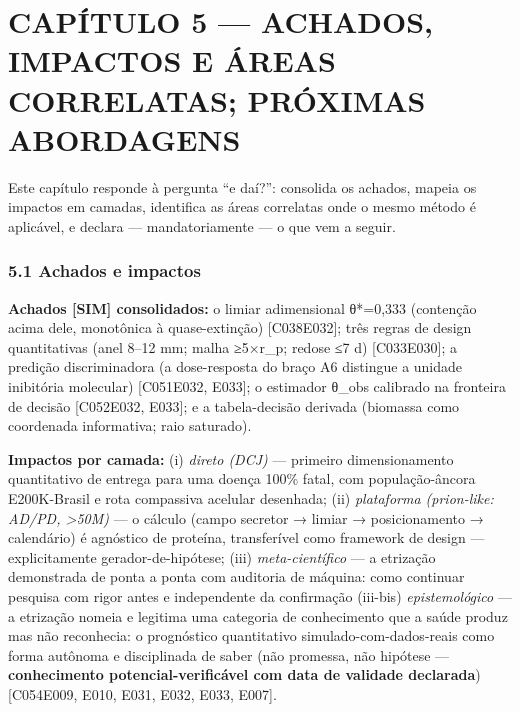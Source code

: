 \documentclass[
  10pt,
]{article}
\begin{document}
\hypertarget{capuxedtulo-5-achados-impactos-e-uxe1reas-correlatas-pruxf3ximas-abordagens}{%
\section{CAPÍTULO 5 --- ACHADOS, IMPACTOS E ÁREAS CORRELATAS; PRÓXIMAS
ABORDAGENS}\label{capuxedtulo-5-achados-impactos-e-uxe1reas-correlatas-pruxf3ximas-abordagens}}

Este capítulo responde à pergunta ``e daí?'': consolida os achados,
mapeia os impactos em camadas, identifica as áreas correlatas onde o
mesmo método é aplicável, e declara --- mandatoriamente --- o que vem a
seguir.

\hypertarget{achados-e-impactos}{%
\subsubsection{5.1 Achados e impactos}\label{achados-e-impactos}}

\textbf{Achados {[}SIM{]} consolidados:} o limiar adimensional θ*=0,333
(contenção acima dele, monotônica à quase-extinção)
{[}C038\textbar E032{]}; três regras de design quantitativas (anel 8--12
mm; malha ≥5×r\_p; redose ≤7 d) {[}C033\textbar E030{]}; a predição
discriminadora (a dose-resposta do braço A6 distingue a unidade
inibitória molecular) {[}C051\textbar E032, E033{]}; o estimador θ\_obs
calibrado na fronteira de decisão {[}C052\textbar E032, E033{]}; e a
tabela-decisão derivada (biomassa como coordenada informativa; raio
saturado).

\textbf{Impactos por camada:} (i) \emph{direto (DCJ)} --- primeiro
dimensionamento quantitativo de entrega para uma doença 100\% fatal, com
população-âncora E200K-Brasil e rota compassiva acelular desenhada; (ii)
\emph{plataforma (prion-like: AD/PD, \textgreater50M)} --- o cálculo
(campo secretor → limiar → posicionamento → calendário) é agnóstico de
proteína, transferível como framework de design --- explicitamente
gerador-de-hipótese; (iii) \emph{meta-científico} --- a etrização
demonstrada de ponta a ponta com auditoria de máquina: como continuar
pesquisa com rigor antes e independente da confirmação (iii-bis)
\emph{epistemológico} --- a etrização nomeia e legitima uma categoria de
conhecimento que a saúde produz mas não reconhecia: o prognóstico
quantitativo simulado-com-dados-reais como forma autônoma e disciplinada
de saber (não promessa, não hipótese --- \textbf{conhecimento
potencial-verificável com data de validade declarada})
{[}C054\textbar E009, E010, E031, E032, E033, E007{]}.
\end{document}
